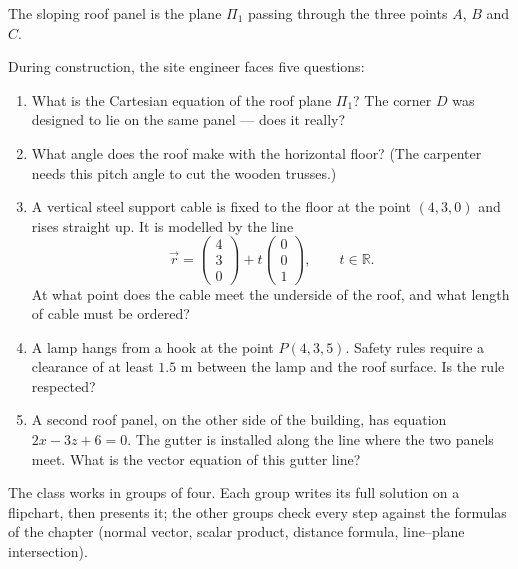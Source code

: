 \documentclass[11pt]{article}
\newcommand{\cle}[1]{{\popxbold\color{popdark}#1}}
\newcounter{popsec}
\newcounter{popsub}
\newcommand{\courssub}[1]{%
  \stepcounter{popsub}%
  \par\vspace{9pt}\noindent{\popxbold\fontsize{11.5}{13}\selectfont\color{popink}{\color{poporange}\thepopsec.\thepopsub}\hspace{6pt}#1}\par\nopagebreak\vspace{4pt}
}
\begin{document}
The sloping \cle{roof panel} is the plane $\Pi_1$ passing through the three points $A$, $B$ and $C$.

During construction, the site engineer faces five questions:

\begin{enumerate}
\item What is the Cartesian equation of the roof plane $\Pi_1$? The corner $D$ was designed to lie on the same panel — does it really?
\item What angle does the roof make with the horizontal floor? (The carpenter needs this pitch angle to cut the wooden trusses.)
\item A vertical steel support cable is fixed to the floor at the point $(4,3,0)$ and rises straight up. It is modelled by the line
\[
\vec{r} = \begin{pmatrix} 4 \\ 3 \\ 0 \end{pmatrix} + t \begin{pmatrix} 0 \\ 0 \\ 1 \end{pmatrix}, \qquad t \in \mathbb{R}.
\]
At what point does the cable meet the underside of the roof, and what length of cable must be ordered?
\item A lamp hangs from a hook at the point $P(4,3,5)$. Safety rules require a clearance of at least $1.5$ m between the lamp and the roof surface. Is the rule respected?
\item A second roof panel, on the other side of the building, has equation $2x - 3z + 6 = 0$. The \cle{gutter} is installed along the line where the two panels meet. What is the vector equation of this gutter line?
\end{enumerate}

The class works in groups of four. Each group writes its full solution on a flipchart, then presents it; the other groups check every step against the formulas of the chapter (normal vector, scalar product, distance formula, line--plane intersection).

\courssub{Tasks}
\end{document}
